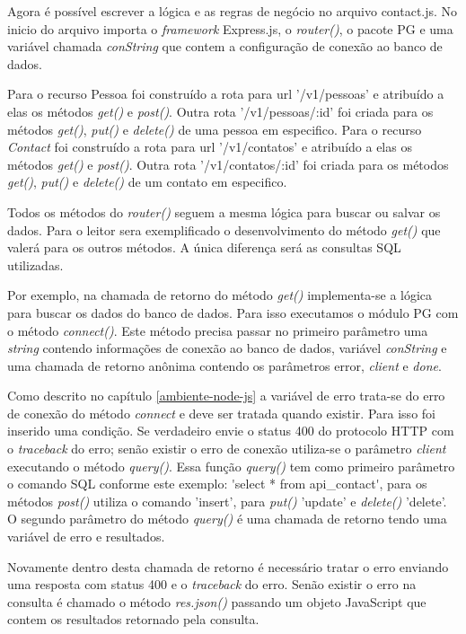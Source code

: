   Agora é possível escrever a lógica e as regras de negócio no arquivo contact.js. No inicio do arquivo importa o \textit{framework}
  Express.js, o \textit{router()}, o pacote PG e uma variável chamada \textit{conString} que contem a configuração de conexão ao banco de dados.
  
  Para o recurso Pessoa foi construído a rota para url '/v1/pessoas' e atribuído a elas os métodos \textit{get()} e \textit{post()}. Outra rota 
  '/v1/pessoas/:id' foi criada para os métodos \textit{get()}, \textit{put()} e \textit{delete()} de uma pessoa em especifico. Para o recurso \textit{Contact} foi 
  construído a rota para url '/v1/contatos' e atribuído a elas os métodos \textit{get()} e \textit{post()}. Outra rota 
  '/v1/contatos/:id' foi criada para os métodos \textit{get()}, \textit{put()} e \textit{delete()} de um contato em especifico.
  
  Todos os métodos do \textit{router()} seguem a mesma lógica para buscar ou salvar os dados. Para o leitor sera exemplificado o desenvolvimento
  do método \textit{get()} que valerá para os outros métodos. A única diferença será as consultas SQL utilizadas. 
  
  Por exemplo, na chamada de retorno do método \textit{get()} implementa-se a lógica para buscar os dados do banco de dados. Para isso executamos 
  o módulo PG com o método \textit{connect()}. Este método precisa passar no primeiro parâmetro uma \textit{string} contendo informações de conexão
  ao banco de dados, variável \textit{conString} e uma chamada de retorno anônima contendo os parâmetros error, \textit{client} e \textit{done}.
  
  Como descrito no capítulo \ref{ambiente-node-js} a variável de erro trata-se do erro de conexão do método \textit{connect} e deve ser 
  tratada quando existir. Para isso foi inserido uma condição. Se verdadeiro envie o status 400 do protocolo HTTP com o 
  \textit{traceback} do erro; senão existir o erro de conexão utiliza-se o parâmetro \textit{client} executando o método \textit{query()}. Essa função \textit{query()}
  tem como primeiro parâmetro o comando SQL conforme este exemplo: \'{}select * from api\_contact\'{}, para os métodos \textit{post()} utiliza o comando
  'insert', para \textit{put()} 'update' e \textit{delete()} 'delete'. O segundo parâmetro do método \textit{query()} é uma chamada de retorno tendo uma 
  variável de erro e resultados.
  
  Novamente dentro desta chamada de retorno é necessário tratar o erro enviando uma resposta com status 400 e o \textit{traceback} do erro.
  Senão existir o erro na consulta é chamado o método \textit{res.json()} passando um objeto JavaScript que contem os resultados retornado
  pela consulta.

